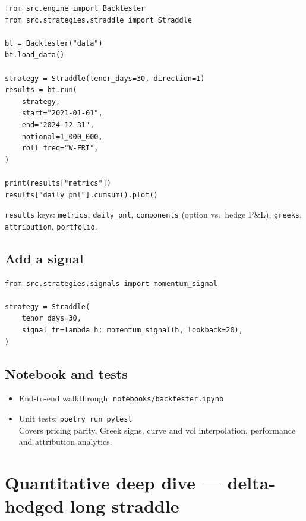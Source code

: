 \documentclass[11pt, a4paper]{article}
\theoremstyle{defstyle}
\newcommand{\code}[1]{\texttt{#1}}
\begin{document}
\begin{lstlisting}[style=python]
from src.engine import Backtester
from src.strategies.straddle import Straddle

bt = Backtester("data")
bt.load_data()

strategy = Straddle(tenor_days=30, direction=1)
results = bt.run(
    strategy,
    start="2021-01-01",
    end="2024-12-31",
    notional=1_000_000,
    roll_freq="W-FRI",
)

print(results["metrics"])
results["daily_pnl"].cumsum().plot()
\end{lstlisting}

\noindent
\code{results} keys: \code{metrics}, \code{daily\_pnl}, \code{components}
(option vs.\ hedge P\&L), \code{greeks}, \code{attribution}, \code{portfolio}.

\subsection{Add a signal}

\begin{lstlisting}[style=python]
from src.strategies.signals import momentum_signal

strategy = Straddle(
    tenor_days=30,
    signal_fn=lambda h: momentum_signal(h, lookback=20),
)
\end{lstlisting}

\subsection{Notebook and tests}

\begin{itemize}
    \item End-to-end walkthrough: \code{notebooks/backtester.ipynb}
    \item Unit tests: \code{poetry run pytest} \\
          Covers pricing parity, Greek signs, curve and vol interpolation,
          performance and attribution analytics.
\end{itemize}

\section{Quantitative deep dive --- delta-hedged long straddle}
\end{document}
